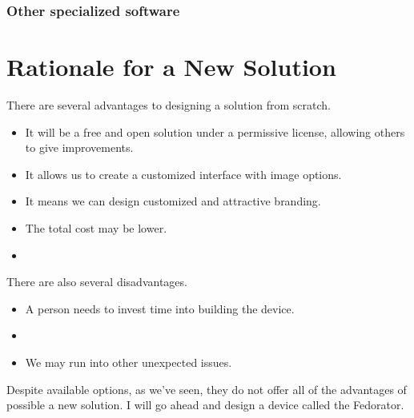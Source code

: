             \subsubsection{Other specialized software}
            
        \subsection{}
    \section{Rationale for a New Solution}
        There are several advantages to designing a solution from scratch.
        
        \begin{itemize}
            \item It will be a free and open solution under a permissive license, allowing others to give improvements.
            \item It allows us to create a customized interface with image options.
            \item It means we can design customized and attractive branding.
            \item The total cost may be lower.
            \item {}
        \end{itemize}
        
        There are also several disadvantages. 
        \begin{itemize}
            \item A person needs to invest time into building the device.
            \item {}
            \item We may run into other unexpected issues.
        \end{itemize}
        
        Despite available options, as we've seen, they do not offer all of the advantages of possible a new solution.  I will go ahead and design a device called the Fedorator.
